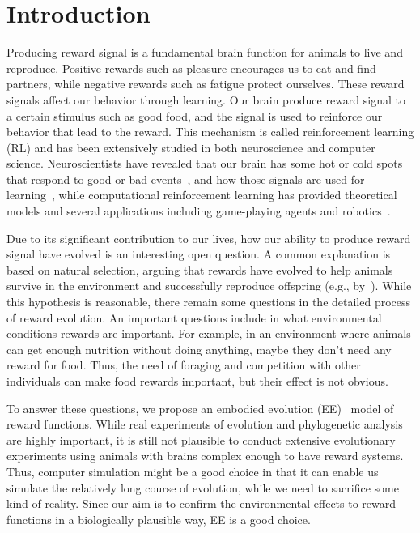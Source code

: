 \section{Introduction}

Producing reward signal is a fundamental brain function for animals to live and reproduce. Positive rewards such as pleasure encourages us to eat and find partners, while negative rewards such as fatigue protect ourselves. These reward signals affect our behavior through learning. Our brain produce reward signal to a certain stimulus such as good food, and the signal is used to reinforce our behavior that lead to the reward. This mechanism is called reinforcement learning (RL) and has been extensively studied in both neuroscience and computer science. Neuroscientists have revealed that our brain has some hot or cold spots that respond to good or bad events~\citep{berridgeAffectiveNeurosciencePleasure2008}, and how those signals are used for learning~\citep{schultzNeuronalRewardDecision2015}, while computational reinforcement learning has provided theoretical models and several applications including game-playing agents and robotics~\citep{suttonReinforcementLearningIntroduction2018}.

Due to its significant contribution to our lives, how our ability to produce reward signal have evolved is an interesting open question. A common explanation is based on natural selection, arguing that rewards have evolved to help animals survive in the environment and successfully reproduce offspring (e.g., by~\cite{schultzNeuronalRewardDecision2015}).
While this hypothesis is reasonable, there remain some questions in the detailed process of reward evolution.
An important questions include in what environmental conditions rewards are important. For example, in an environment where animals can get enough nutrition without doing anything, maybe they don't need any reward for food. Thus, the need of foraging and competition with other individuals can make food rewards important, but their effect is not obvious. 

To answer these questions, we propose an embodied evolution (EE)~\cite{watsonEmbodiedEvolutionDistributing2002} model of reward functions. While real experiments of evolution and phylogenetic analysis are highly important, it is still not plausible to conduct extensive evolutionary experiments using animals with brains complex enough to have reward systems. Thus, computer simulation might be a good choice in that it can enable us simulate the relatively long course of evolution, while we need to sacrifice some kind of reality. Since our aim is to confirm the environmental effects to reward functions in a biologically plausible way, EE is a good choice.

